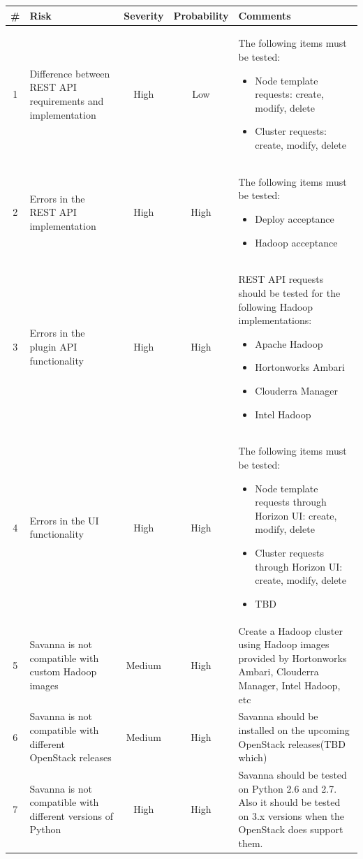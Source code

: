 \documentclass[a4paper,11pt]{article}
\begin{document}
\newpage
\begin{longtable}{|c|p{3cm}|c|c|p{8cm}|}
\hline
\# & {\bf Risk} & {\bf Severity} & {\bf Probability} & {\bf Comments}\\
\hline
1&Difference between REST API requirements and implementation& High & Low & The following items must be tested:
\begin{itemize}
\item Node template requests: create, modify, delete
\item Cluster requests: create, modify, delete
\end{itemize}
\\ \hline
2&Errors in the REST API implementation& High & High & The following items must be tested:
\begin{itemize}
\item Deploy acceptance
\item Hadoop acceptance
\end{itemize}
\\ \hline
3&Errors in the plugin API functionality & High & High & REST API requests should be tested for the following Hadoop implementations:
\begin{itemize}
\item Apache Hadoop
\item Hortonworks Ambari
\item Clouderra Manager
\item Intel Hadoop
\end{itemize}
\\ \hline
4&Errors in the UI functionality & High & High & The following items must be tested:
\begin{itemize}
\item Node template requests through Horizon UI: create, modify, delete
\item Cluster requests through Horizon UI: create, modify, delete
\item TBD
\end{itemize}
\\ \hline
5&Savanna is not compatible with custom Hadoop images & Medium & High & Create a Hadoop cluster using Hadoop images provided by Hortonworks Ambari, 
Clouderra Manager, Intel Hadoop, etc \\ \hline
6&Savanna is not compatible with different OpenStack releases& Medium & High & Savanna should be installed on the upcoming OpenStack releases(TBD which) \\ \hline
7&Savanna is not compatible with different versions of Python& High & High & Savanna should be tested on Python 2.6 and 2.7. Also it should be tested on 3.x versions when the OpenStack does support them. \\ \hline

\end{longtable}
\end{document}
